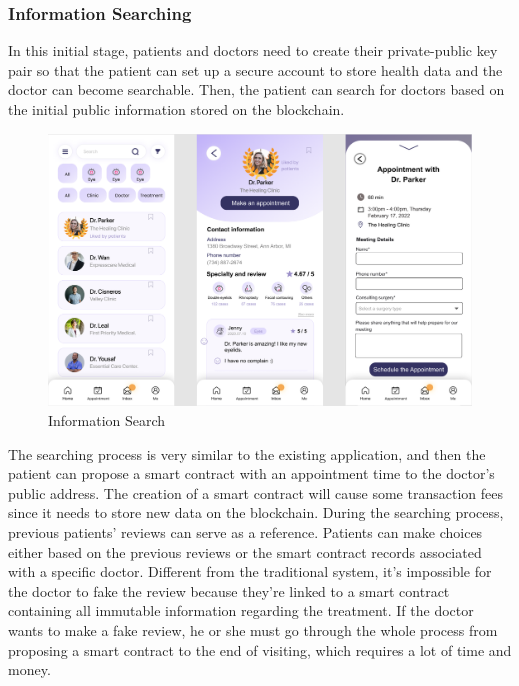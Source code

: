 \documentclass{article}
\begin{document}
\subsubsection{Information Searching}
In this initial stage, patients and doctors need to create their private-public key pair so that the patient can set up a secure account to store health data and the doctor can become searchable. Then, the patient can search for doctors based on the initial public information stored on the blockchain.
\begin{figure}[H]
    \centering
    \includegraphics[scale=0.5]{Appointment.jpg}
    \caption{Information Search}
\end{figure}
The searching process is very similar to the existing application, and then the patient can propose a smart contract with an appointment time to the doctor's public address. The creation of a smart contract will cause some transaction fees since it needs to store new data on the blockchain. During the searching process, previous patients' reviews can serve as a reference. Patients can make choices either based on the previous reviews or the smart contract records associated with a specific doctor. Different from the traditional system, it's impossible for the doctor to fake the review because they're linked to a smart contract containing all immutable information regarding the treatment. If the doctor wants to make a fake review, he or she must go through the whole process from proposing a smart contract to the end of visiting, which requires a lot of time and money.
\end{document}
